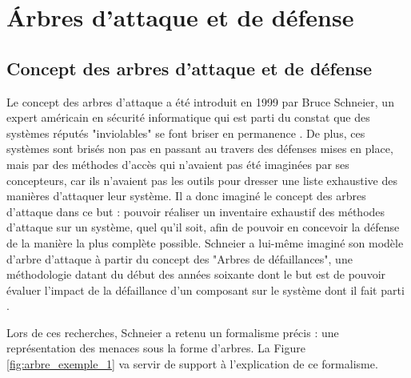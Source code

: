\section{\'Arbres d'attaque et de défense}
	\label{sec:etat_art}

    \subsection{Concept des arbres d'attaque et de défense}
        Le concept des arbres d'attaque a été introduit en 1999 par Bruce Schneier, un expert américain en sécurité informatique qui est parti du constat que des systèmes réputés "inviolables" se font briser en permanence \cite{doc_Schneier}. De plus, ces systèmes sont brisés non pas en passant au travers des défenses mises en place, mais par des méthodes d'accès qui n'avaient pas été imaginées par ses concepteurs, car ils n'avaient pas les outils pour dresser une liste exhaustive des manières d'attaquer leur système. Il a donc imaginé le concept des arbres d'attaque dans ce but : pouvoir réaliser un inventaire exhaustif des méthodes d'attaque sur un système, quel qu'il soit, afin de pouvoir en concevoir la défense de la manière la plus complète possible. Schneier a lui-même imaginé son modèle d'arbre d'attaque à partir du concept des "Arbres de défaillances", une méthodologie datant du début des années soixante dont le but est de pouvoir évaluer l'impact de la défaillance d'un composant sur le système dont il fait parti \cite{defaillanceTree}. 

		Lors de ces recherches, Schneier a retenu un formalisme précis : une représentation des menaces sous la forme d'arbres. La Figure \ref{fig:arbre_exemple_1} va servir de support à l'explication de ce formalisme.

